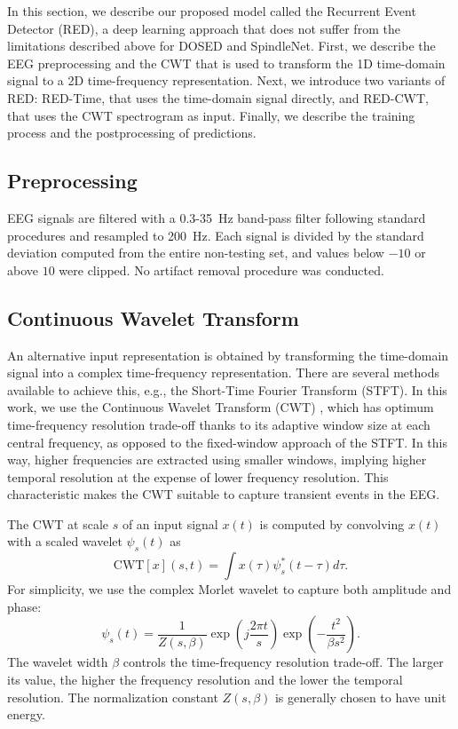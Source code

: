 \documentclass[conference]{IEEEtran}
\begin{document}
In this section, we describe our proposed model called the Recurrent Event Detector (RED), a deep learning approach that does not suffer from the limitations described above for DOSED and SpindleNet. First, we describe the EEG preprocessing and the CWT \cite{addison2017illustrated} that is used to transform the 1D time-domain signal to a 2D time-frequency representation. Next, we introduce two variants of RED: RED-Time, that uses the time-domain signal directly, and RED-CWT, that uses the CWT spectrogram as input. Finally, we describe the training process and the postprocessing of predictions.

\subsection{Preprocessing}
\label{sec:preprocessing}

EEG signals are filtered with a 0.3-35~Hz band-pass filter following standard procedures \cite{berry2012aasm} and resampled to 200~Hz. Each signal is divided by the standard deviation computed from the entire non-testing set, and values below $-10$ or above $10$ were clipped. No artifact removal procedure was conducted.


\subsection{Continuous Wavelet Transform}
\label{sec:cwt}

An alternative input representation is obtained by transforming the time-domain signal into a complex time-frequency representation. There are several methods available to achieve this, e.g., the Short-Time Fourier Transform (STFT). In this work, we use the Continuous Wavelet Transform (CWT) \cite{addison2017illustrated} , which has optimum time-frequency resolution trade-off thanks to its adaptive window size at each central frequency, as opposed to the fixed-window approach of the STFT. In this way, higher frequencies are extracted using smaller windows, implying higher temporal resolution at the expense of lower frequency resolution. This characteristic makes the CWT suitable to capture transient events in the EEG.

The CWT at scale $s$ of an input signal $x(t)$ is computed by convolving $x(t)$ with a scaled wavelet $\psi_s(t)$ as
\begin{equation}
    \mathrm{CWT}[x](s,t) = \int x(\tau) \psi_s^* (t-\tau)d\tau .
    \label{eq:cwt_int}
\end{equation}For simplicity, we use the complex Morlet wavelet to capture both amplitude and phase:
\begin{equation}
    \psi_s(t) = \frac{1}{Z(s, \beta)} \exp\left(j\frac{2\pi t}{s}\right)\exp\left(-\frac{t^2}{\beta s^2}\right).
    \label{eq:cwt_wavelet}
\end{equation}The wavelet width $\beta$ controls the time-frequency resolution trade-off. The larger its value, the higher the frequency resolution and the lower the temporal resolution. The normalization constant $Z(s, \beta)$ is generally chosen to have unit energy.
\end{document}
